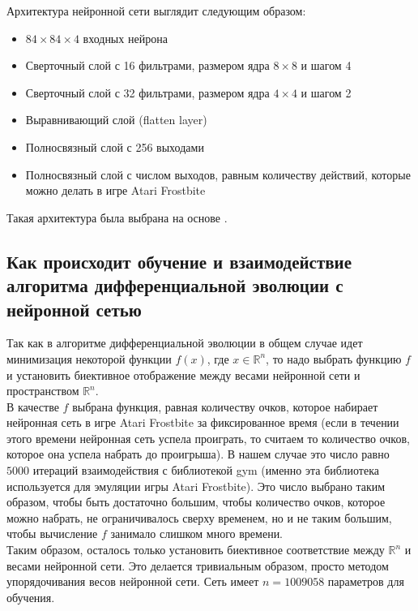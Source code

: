 \documentclass[12pt]{article}
\begin{document}
            Архитектура нейронной сети выглядит следующим образом:
            \begin{itemize}
                \item $84 \times 84 \times 4$ входных нейрона
                \item Сверточный слой с 16 фильтрами, размером ядра $8 \times 8$ и шагом 4
                \item Сверточный слой с 32 фильтрами, размером ядра $4 \times 4$ и шагом 2
                \item Выравнивающий слой (flatten layer)
                \item Полносвязный слой с 256 выходами
                \item Полносвязный слой с числом выходов, равным количеству действий, которые можно делать в игре Atari Frostbite
            \end{itemize}

            Такая архитектура была выбрана на основе \cite{uber}.

    \subsection{Как происходит обучение и взаимодействие алгоритма дифференциальной эволюции с нейронной сетью}
        Так как в алгоритме дифференциальной эволюции в общем случае идет минимизация некоторой функции $f(x)$, где $x \in \mathbb{R}^n$, то надо выбрать функцию $f$ и установить биективное отображение между весами нейронной сети и пространством $\mathbb{R}^n$. \\

        В качестве $f$ выбрана функция, равная количеству очков, которое набирает нейронная сеть в игре Atari Frostbite за фиксированное время (если в течении этого времени нейронная сеть успела проиграть, то считаем то количество очков, которое она успела набрать до проигрыша). В нашем случае это число равно $5000$ итераций взаимодействия с библиотекой gym (именно эта библиотека используется для эмуляции игры Atari Frostbite). Это число выбрано таким образом, чтобы быть достаточно большим, чтобы количество очков, которое можно набрать, не ограничивалось сверху временем, но и не таким большим, чтобы вычисление $f$ занимало слишком много времени. \\

        Таким образом, осталось только установить биективное соответствие между $\mathbb{R}^n$ и весами нейронной сети. Это делается тривиальным образом, просто методом упорядочивания весов нейронной сети. Сеть имеет $n=1009058$ параметров для обучения. \\
\end{document}
